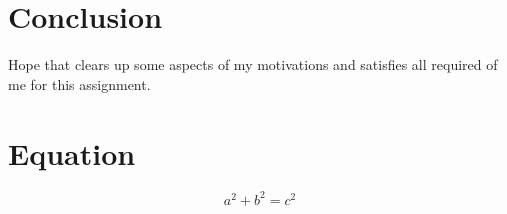 \documentclass{article}
\begin{document}
\section{Conclusion}
Hope that clears up some aspects of my motivations and satisfies all required of me for this assignment.

\section{Equation}

\begin{equation}
a^2 + b^2 = c^2
\end{equation}
\end{document}
